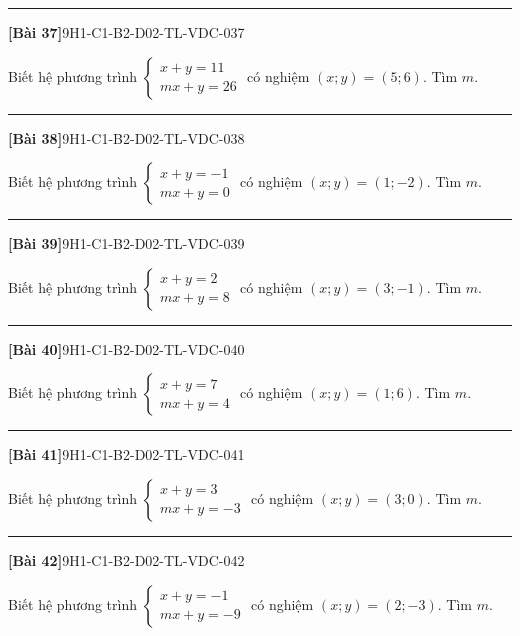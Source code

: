 \documentclass[12pt,a4paper]{article}
\newif\ifloigiai
\newenvironment{cauhoi}[2]{%
  \par\medskip\noindent\rule{\textwidth}{0.4pt}\par\nopagebreak
  \noindent\textbf{[#1]}\hfill{\scriptsize\ttfamily #2}\par\nopagebreak\smallskip}{\par}
\newcommand{\loigiai}[1]{\ifloigiai\par\smallskip\noindent\textit{Lời giải.} #1\par\fi}
\begin{document}
\begin{cauhoi}{Bài 37}{9H1-C1-B2-D02-TL-VDC-037}
Biết hệ phương trình $\begin{cases}x+y=11\\ mx+y=26\end{cases}$ có nghiệm $(x;y)=(5;6)$. Tìm $m$.
\loigiai{Thay $x=5$, $y=6$ vào phương trình thứ hai: $5 m+6=26$ nên $m=\dfrac{26-6}{5}=4$.}
\end{cauhoi}
\begin{cauhoi}{Bài 38}{9H1-C1-B2-D02-TL-VDC-038}
Biết hệ phương trình $\begin{cases}x+y=-1\\ mx+y=0\end{cases}$ có nghiệm $(x;y)=(1;-2)$. Tìm $m$.
\loigiai{Thay $x=1$, $y=-2$ vào phương trình thứ hai: $1 m-2=0$ nên $m=\dfrac{0+2}{1}=2$.}
\end{cauhoi}
\begin{cauhoi}{Bài 39}{9H1-C1-B2-D02-TL-VDC-039}
Biết hệ phương trình $\begin{cases}x+y=2\\ mx+y=8\end{cases}$ có nghiệm $(x;y)=(3;-1)$. Tìm $m$.
\loigiai{Thay $x=3$, $y=-1$ vào phương trình thứ hai: $3 m-1=8$ nên $m=\dfrac{8+1}{3}=3$.}
\end{cauhoi}
\begin{cauhoi}{Bài 40}{9H1-C1-B2-D02-TL-VDC-040}
Biết hệ phương trình $\begin{cases}x+y=7\\ mx+y=4\end{cases}$ có nghiệm $(x;y)=(1;6)$. Tìm $m$.
\loigiai{Thay $x=1$, $y=6$ vào phương trình thứ hai: $1 m+6=4$ nên $m=\dfrac{4-6}{1}=-2$.}
\end{cauhoi}
\begin{cauhoi}{Bài 41}{9H1-C1-B2-D02-TL-VDC-041}
Biết hệ phương trình $\begin{cases}x+y=3\\ mx+y=-3\end{cases}$ có nghiệm $(x;y)=(3;0)$. Tìm $m$.
\loigiai{Thay $x=3$, $y=0$ vào phương trình thứ hai: $3 m+0=-3$ nên $m=\dfrac{-3-0}{3}=-1$.}
\end{cauhoi}
\begin{cauhoi}{Bài 42}{9H1-C1-B2-D02-TL-VDC-042}
Biết hệ phương trình $\begin{cases}x+y=-1\\ mx+y=-9\end{cases}$ có nghiệm $(x;y)=(2;-3)$. Tìm $m$.
\loigiai{Thay $x=2$, $y=-3$ vào phương trình thứ hai: $2 m-3=-9$ nên $m=\dfrac{-9+3}{2}=-3$.}
\end{cauhoi}
\end{document}
